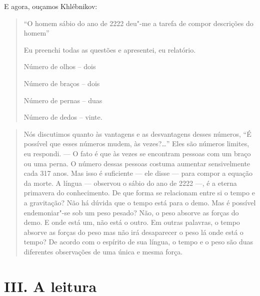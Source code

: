 E agora, ouçamos Khlébnikov:

\begin{quote}
``O homem sábio do ano de 2222 deu"-me a tarefa de compor descrições do
homem''

Eu preenchi todas as questões e apresentei, eu relatório.

Número de olhos -- dois

Número de braços -- dois

Número de pernas -- duas

Número de dedos -- vinte.
  \end{quote}



\begin{quote}
Nós discutimos quanto às vantagens e as desvantagens desses números, ``É
possível que esses números mudem, às vezes?\ldots{}'' Eles são números
limites, eu respondi. --- O fato é que às vezes se encontram pessoas com
um braço ou uma perna. O número dessas pessoas costuma aumentar
sensivelmente cada 317 anos. Mas isso é suficiente --- ele disse --- para
compor a equação da morte. A língua --- observou o sábio do ano de 2222 ---,
é a eterna primavera do conhecimento. De que forma se relacionam entre
si o tempo e a gravitação? Não há dúvida que o tempo está para o demo.
Mas é possível endemoniar"-se sob um peso pesado? Não, o peso absorve as
forças do demo. E onde está um, não está o outro. Em outras palavras, o
tempo absorve as forças do peso mas não irá desaparecer o peso lá onde
está o tempo? De acordo com o espírito de sua língua, o tempo e o peso
são duas diferentes observações de uma única e mesma força.
\end{quote}

\section{III. A leitura}

